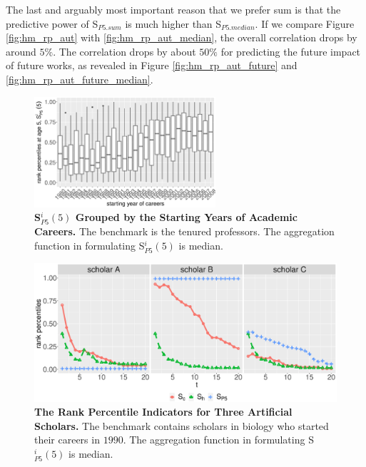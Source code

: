 \begin{refsection}
The last and arguably most important reason that we prefer sum is that the predictive power of S$_{P5.sum}$ is much higher than S$_{P5.median}$. If we compare Figure \ref{fig:hm_rp_aut} with \ref{fig:hm_rp_aut_median}, the overall correlation drops by around $5\%$. The correlation drops by about $50\%$ for predicting the future impact of future works, as revealed in Figure \ref{fig:hm_rp_aut_future} and \ref{fig:hm_rp_aut_future_median}.

\begin{figure}[ht!]
    \centering
    \includegraphics[width=0.6\textwidth]{figures/stationarity/rp_stationarity_median.eps}
    \caption{{\bf S$_{P5}^i(5)$ Grouped by the Starting Years of Academic Careers.}
    The benchmark is the tenured professors. The aggregation function in formulating S$_{P5}^i(5)$ is median.} 
    \label{fig:rp_stationarity_median}
\end{figure}

\begin{figure}[!ht]
    \centering
    \includegraphics[width=\textwidth]{figures/compare_autrp/simulated_authors_median.eps}
    \caption{{\bf The Rank Percentile Indicators for Three Artificial Scholars.} The benchmark contains scholars in biology who started their careers in $1990$. The aggregation function in formulating S$_{P5}^i(5)$ is median.}
    \label{fig:simulated_authors_median}
\end{figure}


\end{refsection}
